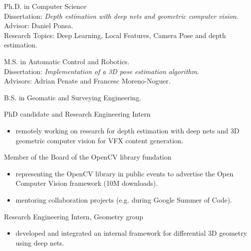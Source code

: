 \documentclass{article}
\begin{document}


\begin{llist}
\label{Education}

 
Ph.D. in Computer Science\\
Dissertation: \textit{Depth estimation with deep nets and geometric computer vision}.\\
Advisor: Daniel Ponsa.\\
Research Topics: Deep Learning, Local Features, Camera Pose and depth estimation.

 
M.S. in Automatic Control and Robotics.\\
Dissertation: \textit{Implementation of a 3D pose estimation algorithm}.\\
Advisors: Adrian Penate and Francesc Moreno-Noguer.

 
B.S. in Geomatic and Surveying Engineering.


\label{Work Experience}
\vspace{-0.33cm}

PhD candidate and Research Engineering Intern
\vspace{-0.33cm}
\begin{itemize}
 \item remotely working on research for depth estimation with deep nets and 3D geometric computer vision for VFX content generation.
\end{itemize}

\location{}
Member of the Board of the OpenCV library fundation
\vspace{-0.33cm}
\begin{itemize}
 \item representing the OpenCV library in public events to advertise the Open Computer Vision framework (10M downloads).
 \item mentoring collaboration projects (e.g. during Google Summer of Code).
\end{itemize}

Research Engineering Intern, Geometry group
\vspace{-0.33cm}
\begin{itemize}
 \item developed and integrated an internal framework for differential 3D geometry using deep nets.
\end{itemize}


\end{llist}
\end{document}
